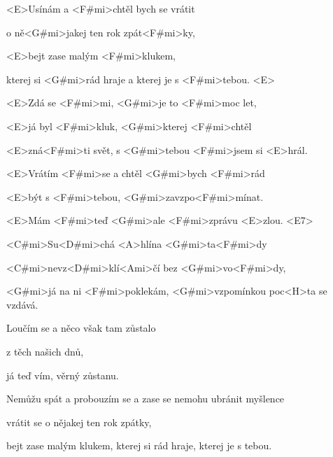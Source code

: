 

\zs
<E>Usínám a <F#mi>chtěl bych se vrátit

o ně<G#mi>jakej ten rok zpát<F#mi>ky,

<E>bejt zase malým <F#mi>klukem,

kterej si <G#mi>rád hraje a kterej je s <F#mi>tebou. <E>
\ks

\zs
<E>Zdá se <F#mi>mi, <G#mi>je to <F#mi>moc let,

<E>já byl <F#mi>kluk, <G#mi>kterej <F#mi>chtěl

<E>zná<F#mi>ti svět, s <G#mi>tebou <F#mi>jsem si <E>hrál.
\ks

\zs
<E>Vrátím <F#mi>se a chtěl <G#mi>bych <F#mi>rád

<E>být s <F#mi>tebou, <G#mi>zavzpo<F#mi>mínat.

<E>Mám <F#mi>teď <G#mi>ale <F#mi>zprávu <E>zlou. <E7>
\ks

\zr
<C#mi>Su<D#mi>chá <A>hlína <G#mi>ta<F#mi>dy

<C#mi>nevz<D#mi>klí<Ami>čí bez <G#mi>vo<F#mi>dy,

<G#mi>já na ni <F#mi>poklekám, <G#mi>vzpomínkou poc<H>ta se vzdává.
\kr

\zs
Loučím se a něco však tam zůstalo

z těch našich dnů,

já teď vím, věrný zůstanu.
\ks

\zr \kr

\zs
Nemůžu spát a probouzím se a zase se nemohu ubránit myšlence

vrátit se o nějakej ten rok zpátky,

bejt zase malým klukem, kterej si rád hraje, kterej je s tebou.
\ks

\kp
